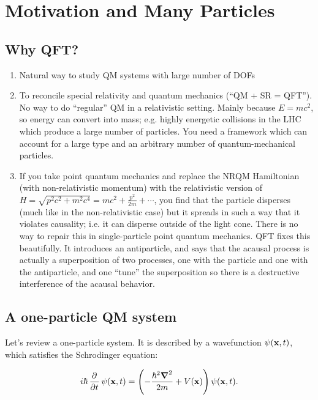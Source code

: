 \section{Motivation and Many Particles}

\subsection{Why QFT?}
\begin{enumerate}
    \item Natural way to study QM systems with large number of DOFs
    \item To reconcile special relativity and quantum mechanics (``QM + SR = QFT''). No way to do ``regular'' QM in a relativistic setting. Mainly because $E = mc^2$, so energy can convert into mass; e.g. highly energetic collisions in the LHC which produce a large number of particles. You need a framework which can account for a large type and an arbitrary number of quantum-mechanical particles.
    \item If you take point quantum mechanics and replace the NRQM Hamiltonian (with non-relativistic momentum) with the relativistic version of $H = \sqrt{p^2c^2 + m^2c^4} = mc^2 + \frac{p^2}{2m} + \cdots$, you find that the particle disperses (much like in the non-relativistic case) but it spreads in such a way that it violates causality; i.e. it can disperse outside of the light cone. There is no way to repair this in single-particle point quantum mechanics. QFT fixes this beautifully. It introduces an antiparticle, and says that the acausal process is actually a superposition of two processes, one with the particle and one with the antiparticle, and one  ``tune'' the superposition so there is a destructive interference of the acausal behavior.
\end{enumerate} 

\subsection{A one-particle QM system}
Let's review a one-particle system. It is described by a wavefunction $\psi(\mathbf{x}, t)$, which satisfies the Schrodinger equation:

\begin{equation}
    i\hbar \dpd{}{t}\psi(\v{x}, t) = \left(-\frac{\hbar^2 \nabla^2}{2m} + V(\v{x})\right)\psi(\v{x}, t).
\end{equation}

